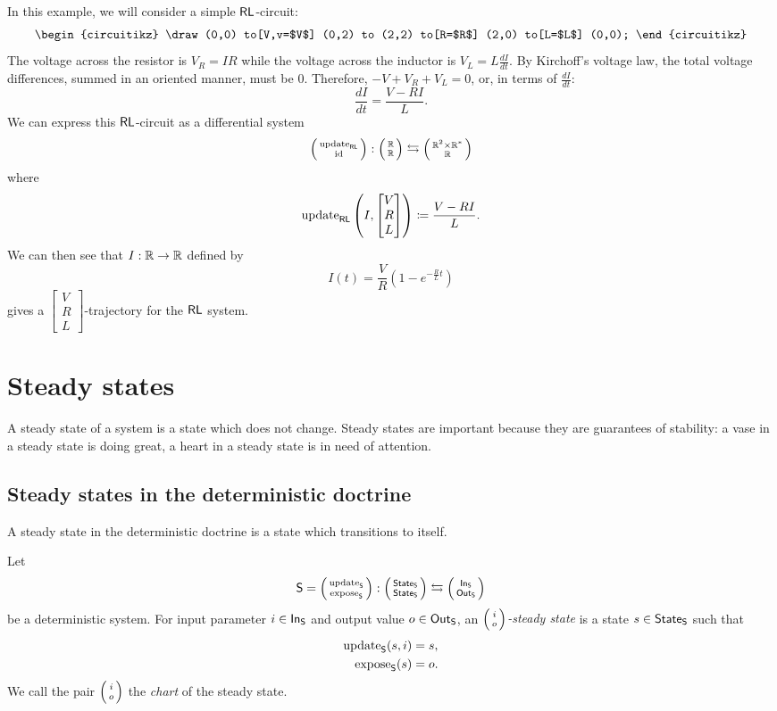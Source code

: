 \documentclass[DynamicalBook]{subfiles}
\begin{document}
\begin{example}\label{ex.RL_circuit_trajectory}
  In this example, we will consider a simple $\mathsf{RL}$-circuit:
  \[
    \begin{circuitikz}
      \draw (0,0)
      to[V,v=$V$] (0,2) %
      to (2,2)
      to[R=$R$] (2,0) %
      to[L=$L$] (0,0);
    \end{circuitikz}
  \]
  The voltage across the resistor is $V_R = IR$ while the 
  voltage across the inductor is $V_L = L \frac{dI}{dt}$. By Kirchoff's voltage
  law, the total voltage differences, summed in an oriented manner, must be $0$.
  Therefore, $-V + V_R + V_L = 0$, or, in terms of $\frac{dI}{dt}$:
  \[
\frac{dI}{dt} = \frac{V - RI}{L}.
  \]
  We can express this $\mathsf{RL}$-circuit as a differential system
  \[
\lens{\update{RL}}{\id} : \lens{\rr}{\rr} \fromto \lens{\rr^2 \times \rr^{\ast}}{\rr}
  \]
  where
  \[
\mathrm{update}_{\mathsf{RL}}\left( I, \begin{bmatrix} V \\ R \\ L \end{bmatrix} \right) \coloneqq
\frac{V - RI}{L}.
  \]
  We can then see that $I : \mathbb{R} \to \mathbb{R}$ defined by
  $$I(t) = \frac{V}{R}(1 - e^{-\frac{R}{L}t})$$
  gives a $\begin{bmatrix}V \\ R \\ L \end{bmatrix}$-trajectory for the
  $\mathsf{RL}$ system. 
\end{example}

\section{Steady states}

A steady state of a system is a state which does not change. Steady states are
important because they are guarantees of stability: a vase in a steady state is doing great, a heart in a steady state is in need of attention.

\subsection{Steady states in the deterministic doctrine}

A steady state in the deterministic doctrine is a state which transitions to itself.

\begin{definition}\label{def.steady_state_discrete}
 Let $$\Sys{S} = \lens{\update{S}}{\expose{S}} : \lens{\State{S}}{\State{S}}
 \leftrightarrows \lens{\In{S}}{\Out{S}}$$
 be a deterministic system. For input parameter $i \in \mathsf{In}_{\mathsf{S}}$ and output value
 $o \in \mathsf{Out}_{\mathsf{S}}$, an \emph{$\lens{i}{o}$-steady state} is a state $s \in \mathsf{State}_{\mathsf{S}}$
 such that
 \begin{align*}
   \mathrm{update}_{\mathsf{S}}(s, i) &= s, \\
   \mathrm{expose}_{\mathsf{S}}(s) &= o.
 \end{align*}
 We call the pair $\lens{i}{o}$ the \emph{chart} of the steady state.
\end{definition}
\end{document}
